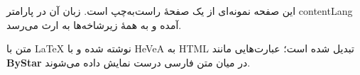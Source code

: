 \begin{faPar}
این صفحه نمونه‌ای از یک صفحهٔ راست‌به‌چپ است. زبان آن در پارامتر contentLang آمده و به همهٔ
زیرشاخه‌ها به ارث می‌رسد.
\end{faPar}

\begin{faPar}
متن با LaTeX نوشته شده و با HeVeA به HTML تبدیل شده است؛ عبارت‌هایی مانند \textbf{ByStar} در میان متن
فارسی درست نمایش داده می‌شوند.
\end{faPar}
